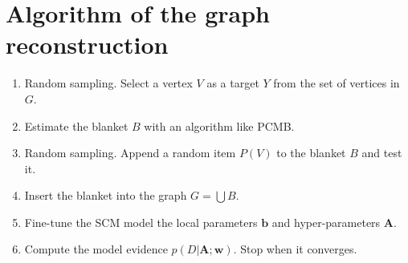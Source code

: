\documentclass[12pt]{article}
\begin{document}
\section*{Algorithm of the graph reconstruction}
\begin{enumerate}
\item Random sampling. Select a vertex $V$ as a target $Y$ from the set of vertices in $G$.
\item Estimate the blanket $B$ with an algorithm like PCMB. %
\item Random sampling. Append a random item $P(V)$ to the blanket $B$ and test it. 
\item Insert the blanket into the graph $G = \bigcup B$.
\item Fine-tune the SCM model the local parameters $\mathbf{b}$ and hyper-parameters $\mathbf{A}$.
\item Compute the model evidence $p(D|\mathbf{A};\mathbf{w})$. Stop when it converges. 
\end{enumerate}
\end{document}
